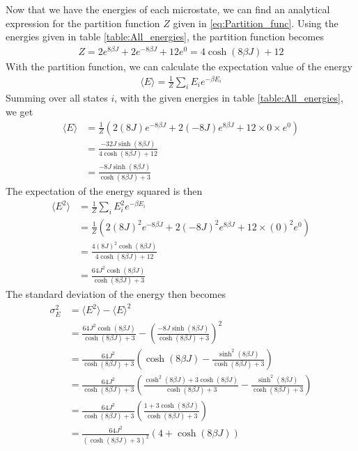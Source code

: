 \documentclass[12pt]{article}
\begin{document}
Now that we have the energies of each microstate, we can find an analytical expression for the partition function $Z$ given in \ref{eq:Partition_func}. Using the energies given in table \ref{table:All_energies}, the partition function becomes
\begin{align*}
Z = 2e^{8\beta J} + 2e^{-8\beta J} + 12 e^0 = 4\cosh(8\beta J) + 12
\end{align*}
With the partition function, we can calculate the expectation value of the energy
\begin{align*}
\langle E\rangle = \frac{1}{Z}\displaystyle \sum_i E_ie^{-\beta E_i}
\end{align*}
Summing over all states $i$, with the given energies in table \ref{table:All_energies}, we get
\begin{align*}
\langle E \rangle &= \frac{1}{Z}\left( 2(8J)e^{-8\beta J} + 2(-8J)e^{8\beta J} + 12\times0\times e^0 \right)\\
&= \frac{-32J \sinh(8\beta J)}{4\cosh(8\beta J) + 12}\\
&= \frac{-8J\sinh(8\beta J)}{\cosh(8\beta J) + 3}
\end{align*}
The expectation of the energy squared is then
\begin{align*}
\langle E^2\rangle &= \frac{1}{Z}\displaystyle \sum_i E_i^2 e^{-\beta E_i} \\
&= \frac{1}{Z} \left(2(8J)^2 e^{-8\beta J} + 2(-8J)^2 e^{8\beta J} + 12 \times (0)^2 e^0 \right) \\
&= \frac{4(8J)^2\cosh(8\beta J)}{4\cosh(8\beta J) + 12} \\
&= \frac{64J^2\cosh(8\beta J)}{\cosh(8\beta J) + 3}
\end{align*}
The standard deviation of the energy then becomes
\begin{align*}
\sigma_E^2 &= \langle E^2\rangle - \langle E \rangle^2 \\
&=\frac{64J^2\cosh(8\beta J)}{\cosh(8\beta J) + 3} - \left( \frac{-8J\sinh(8\beta J)}{\cosh(8\beta J) + 3}\right)^2 \\
&= \frac{64J^2}{\cosh(8\beta J) + 3}\left(\cosh(8\beta J) - \frac{\sinh^2(8\beta J)}{\cosh(8\beta J) + 3} \right) \\
&= \frac{64J^2}{\cosh(8\beta J) + 3}\left(\frac{\cosh^2(8\beta J) + 3\cosh(8\beta J)}{\cosh(8\beta J) + 3} - \frac{\sinh^2(8\beta J)}{\cosh(8\beta J) + 3} \right) \\
&= \frac{64J^2}{\cosh(8\beta J) + 3}\left(\frac{1 + 3\cosh(8\beta J)}{\cosh(8\beta J) + 3} \right)\\
&= \frac{64J^2}{(\cosh(8\beta J) + 3)^2}(4+\cosh(8\beta J))
\end{align*}
\end{document}

